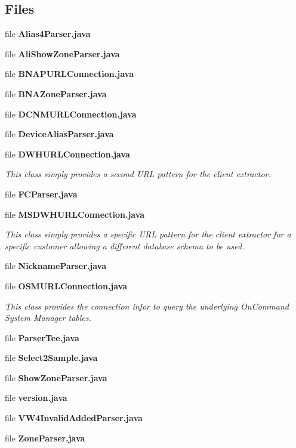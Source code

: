 \subsection*{Files}
\begin{DoxyCompactItemize}
\item 
file {\bf Alias4\+Parser.\+java}
\item 
file {\bf Ali\+Show\+Zone\+Parser.\+java}
\item 
file {\bf B\+N\+A\+P\+U\+R\+L\+Connection.\+java}
\item 
file {\bf B\+N\+A\+Zone\+Parser.\+java}
\item 
file {\bf D\+C\+N\+M\+U\+R\+L\+Connection.\+java}
\item 
file {\bf Device\+Alias\+Parser.\+java}
\item 
file {\bf D\+W\+H\+U\+R\+L\+Connection.\+java}
\begin{DoxyCompactList}\small\item\em This class simply provides a second U\+R\+L pattern for the client extractor. \end{DoxyCompactList}\item 
file {\bf F\+C\+Parser.\+java}
\item 
file {\bf M\+S\+D\+W\+H\+U\+R\+L\+Connection.\+java}
\begin{DoxyCompactList}\small\item\em This class simply provides a specific U\+R\+L pattern for the client extractor for a specific customer allowing a different database schema to be used. \end{DoxyCompactList}\item 
file {\bf Nickname\+Parser.\+java}
\item 
file {\bf O\+S\+M\+U\+R\+L\+Connection.\+java}
\begin{DoxyCompactList}\small\item\em This class provides the connection infor to query the underlying On\+Command System Manager tables. \end{DoxyCompactList}\item 
file {\bf Parser\+Tee.\+java}
\item 
file {\bf Select2\+Sample.\+java}
\item 
file {\bf Show\+Zone\+Parser.\+java}
\item 
file {\bf version.\+java}
\item 
file {\bf V\+W4\+Invalid\+Added\+Parser.\+java}
\item 
file {\bf Zone\+Parser.\+java}
\item 

\end{DoxyCompactItemize}

